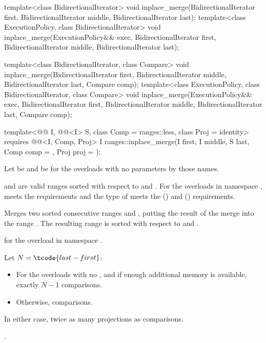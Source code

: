%
\begin{itemdecl}
template<class BidirectionalIterator>
  void inplace_merge(BidirectionalIterator first,
                     BidirectionalIterator middle,
                     BidirectionalIterator last);
template<class ExecutionPolicy, class BidirectionalIterator>
  void inplace_merge(ExecutionPolicy&& exec,
                     BidirectionalIterator first,
                     BidirectionalIterator middle,
                     BidirectionalIterator last);

template<class BidirectionalIterator, class Compare>
  void inplace_merge(BidirectionalIterator first,
                     BidirectionalIterator middle,
                     BidirectionalIterator last, Compare comp);
template<class ExecutionPolicy, class BidirectionalIterator, class Compare>
  void inplace_merge(ExecutionPolicy&& exec,
                     BidirectionalIterator first,
                     BidirectionalIterator middle,
                     BidirectionalIterator last, Compare comp);

template<@@ I, @@<I> S, class Comp = ranges::less,
         class Proj = identity>
  requires @@<I, Comp, Proj>
  I ranges::inplace_merge(I first, I middle, S last, Comp comp = {}, Proj proj = {});
\end{itemdecl}

\begin{itemdescr}
\pnum
Let  be 
and  be 
for the overloads with no parameters by those names.

\pnum
\expects
{} and  are valid ranges
sorted with respect to  and .
For the overloads in namespace ,
 meets
the  requirements and
the type of  meets
the  () and
 () requirements.

\pnum
\effects
Merges two sorted consecutive ranges
 and ,
putting the result of the merge into the range .
The resulting range is sorted with respect to  and .

\pnum
\returns
{} for the overload in namespace .

\pnum
\complexity
Let $N = \tcode{last - first}$:
\begin{itemize}
\item
  For the overloads with no , and
  if enough additional memory is available, exactly $N - 1$ comparisons.
\item
  Otherwise,  comparisons.
\end{itemize}
In either case, twice as many projections as comparisons.

\pnum
\remarks
{}.
\end{itemdescr}

